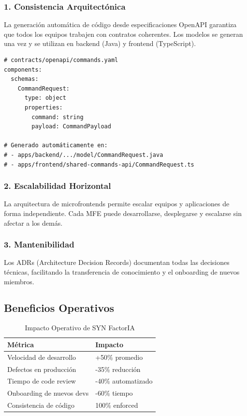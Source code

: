 \documentclass[12pt,a4paper,spanish]{article}
\begin{document}
\subsubsection{1. Consistencia Arquitectónica}

La generación automática de código desde especificaciones OpenAPI garantiza que todos los equipos trabajen con contratos coherentes. Los modelos se generan una vez y se utilizan en backend (Java) y frontend (TypeScript).

\begin{verbatim}
# contracts/openapi/commands.yaml
components:
  schemas:
    CommandRequest:
      type: object
      properties:
        command: string
        payload: CommandPayload

# Generado automáticamente en:
# - apps/backend/.../model/CommandRequest.java
# - apps/frontend/shared-commands-api/CommandRequest.ts
\end{verbatim}

\subsubsection{2. Escalabilidad Horizontal}

La arquitectura de microfrontends permite escalar equipos y aplicaciones de forma independiente. Cada MFE puede desarrollarse, desplegarse y escalarse sin afectar a los demás.

\subsubsection{3. Mantenibilidad}

Los ADRs (Architecture Decision Records) documentan todas las decisiones técnicas, facilitando la transferencia de conocimiento y el onboarding de nuevos miembros.

\subsection{Beneficios Operativos}

\begin{table}[h]
\centering
\begin{tabular}{@{}p{5cm}p{5cm}@{}}
\toprule
\textbf{Métrica} & \textbf{Impacto} \\
\midrule
Velocidad de desarrollo & +50\% promedio \\
\midrule
Defectos en producción & -35\% reducción \\
\midrule
Tiempo de code review & -40\% automatizado \\
\midrule
Onboarding de nuevos devs & -60\% tiempo \\
\midrule
Consistencia de código & 100\% enforced \\
\bottomrule
\end{tabular}
\caption{Impacto Operativo de SYN FactorIA}
\end{table}
\end{document}
